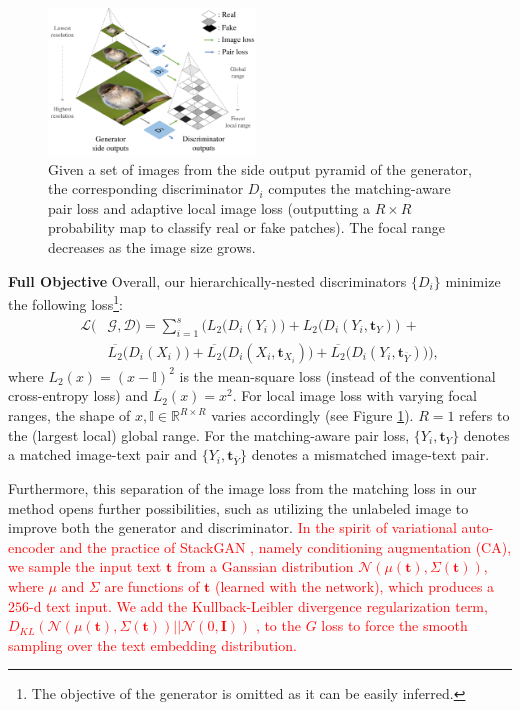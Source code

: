 \documentclass[10pt,twocolumn,letterpaper]{article}
\begin{document}
\begin{figure}[t]
	\centering
	\includegraphics[width=0.49\textwidth]{figure/loss.pdf}
	\vspace{-.5cm}
	\caption{Given a set of images from the side output pyramid of the generator, the corresponding discriminator $D_i$ computes the matching-aware pair loss and adaptive local image loss (outputting a $R{\times}R$ probability map to classify real or fake patches). The focal range decreases as the image size grows. }  \vspace{-.3cm}
	\label{fig:loss}
\end{figure}


\textbf{Full Objective } Overall, our hierarchically-nested discriminators $\{D_i\}$ minimize the following loss\footnote{The objective of the generator is omitted as it can be easily inferred.}:
\vspace{-.2cm}
\begin{equation}
\begin{split}
\mathcal{L}(& \mathcal{G}, \mathcal{D})  = \sum_{i=1}^{s} \Big(  L_2\big(D_i({Y}_i)\big) +  L_2\big(D_i({Y}_i, \bm t_{Y})\big) \, + \\ 
& \overline{L_2}\big(D_i({X}_i)\big)  + \overline{L_2}\big(D_i({X}_i, \bm{t}_{X_i})\big) + \overline{L_2}\big(D_i({Y}_i,  \bm{t}_{\overline{Y}})\big) \Big),
\end{split}
\end{equation}
where $L_2(x) = (x - \mathbb{I})^2$ is the mean-square loss (instead of the conventional cross-entropy loss) and $\overline{L_2}(x) =x^2$. For local image loss with varying focal ranges, the shape of $x, \mathbb{I} \in \mathbb{R}^{R{\times}R}$ varies accordingly (see Figure \ref{fig:loss}). $R=1$ refers to the (largest local) global range. For the matching-aware pair loss, 
$\{Y_i, \bm t_{Y}\}$ denotes a matched image-text pair and $\{Y_i, \bm{t}_{\overline{Y}}\}$ denotes a mismatched image-text pair.

Furthermore, this separation of the image loss from the matching loss in our method opens further possibilities, such as utilizing the unlabeled image to improve both the generator and discriminator.
\textcolor{red}{In the spirit of variational auto-encoder \cite{vae} and the practice of StackGAN \cite{han2017stackgan}, namely conditioning augmentation (CA), we sample the input text $\bm t$ from a Ganssian distribution $\mathcal{N}(\mu({\bm t}), \Sigma({\bm t}))$, where $\mu$ and $\Sigma$ are functions of $\bm t$ (learned with the network), which produces a $256$-d text input.
We add the Kullback-Leibler divergence regularization term, $D_{KL}(\mathcal{N}(\mu({\bm t}), \Sigma({\bm t}) )|| \mathcal{N}(0, \bm{I}))$ \cite{vae}, to the $G$ loss to force the smooth sampling over the text embedding distribution. }
\end{document}
